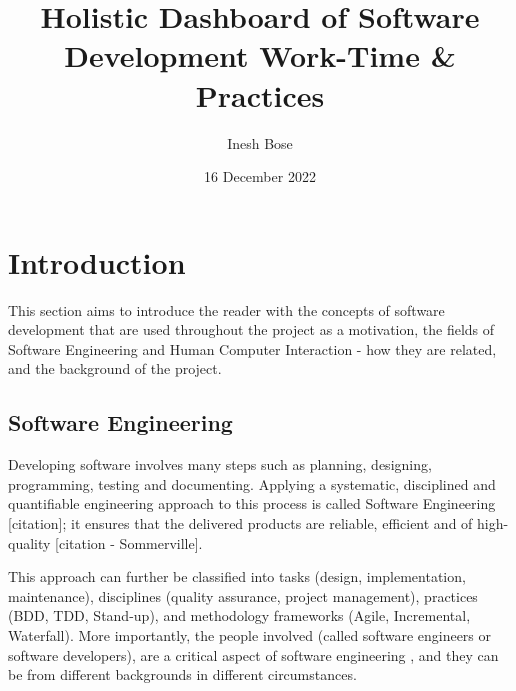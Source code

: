\documentclass{mprop}
\begin{document}
\title{Holistic Dashboard of Software Development Work-Time \& Practices}
\author{Inesh Bose}
\date{16 December 2022}
\maketitle


\tableofcontents
\newpage

\section{Introduction}




This section aims to introduce the reader with the concepts of software development that are used throughout the project as a motivation, the fields of Software Engineering and Human Computer Interaction - how they are related, and the background of the project.

\subsection{Software Engineering}

Developing software involves many steps such as planning, designing, programming, testing and documenting. Applying a systematic, disciplined and quantifiable engineering approach to this process is called Software Engineering [citation]; it ensures that the delivered products are reliable, efficient and of high-quality [citation - Sommerville].

This approach can further be classified into tasks (design, implementation, maintenance), disciplines (quality assurance, project management), practices (BDD, TDD, Stand-up), and methodology frameworks (Agile, Incremental, Waterfall). More importantly, the people involved (called software engineers or software developers), are a critical aspect of software engineering \cite{martinAgileSoftwareDevelopment2003}, and they can be from different backgrounds in different circumstances.
\end{document}
